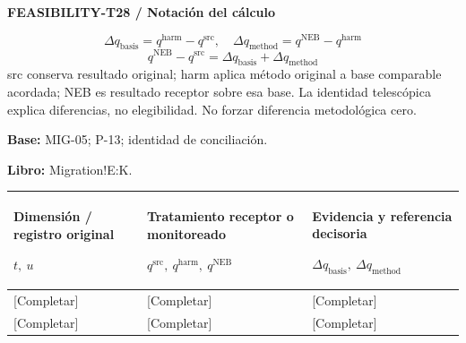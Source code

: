 \Needspace{112mm}
\par\begingroup\sffamily\fontsize{8}{10}\selectfont\color{NEBGreen}\setlength{\parskip}{2pt}\setlength{\abovedisplayskip}{4pt}\setlength{\belowdisplayskip}{4pt}\setlength{\abovedisplayshortskip}{2pt}\setlength{\belowdisplayshortskip}{3pt}
\textbf{FEASIBILITY-T28 / Notación del cálculo}\par
{\fontsize{9}{11}\selectfont\[ \Delta q_{\mathrm{basis}}=q^{\mathrm{harm}}-q^{\mathrm{src}},\quad \Delta q_{\mathrm{method}}=q^{\mathrm{NEB}}-q^{\mathrm{harm}} \]}
{\fontsize{9}{11}\selectfont\[ q^{\mathrm{NEB}}-q^{\mathrm{src}}=\Delta q_{\mathrm{basis}}+\Delta q_{\mathrm{method}} \]}
src conserva resultado original; harm aplica método original a base comparable acordada; NEB es resultado receptor sobre esa base. La identidad telescópica explica diferencias, no elegibilidad. No forzar diferencia metodológica cero.\par
\textbf{Base:} MIG-05; P-13; identidad de conciliación.\par
\textbf{Libro:} Migration!E:K.\par\endgroup
{\sffamily\fontsize{8.3}{10.3}\selectfont\begin{longtable}{@{}P{54.83mm} P{54.83mm} P{54.83mm}@{}}
\toprule
\textbf{Dimensión / registro original}\par {\normalfont\fontsize{8.2}{10}\selectfont $t,\ u$} & \textbf{Tratamiento receptor o monitoreado}\par {\normalfont\fontsize{8.2}{10}\selectfont $q^{\mathrm{src}},\ q^{\mathrm{harm}},\ q^{\mathrm{NEB}}$} & \textbf{Evidencia y referencia decisoria}\par {\normalfont\fontsize{8.2}{10}\selectfont $\Delta q_{\mathrm{basis}},\ \Delta q_{\mathrm{method}}$}\\\midrule\endhead
\rule{0pt}{8mm}[Completar] & [Completar] & [Completar]\\\hline
\rule{0pt}{8mm}[Completar] & [Completar] & [Completar]\\\hline
\end{longtable}}

